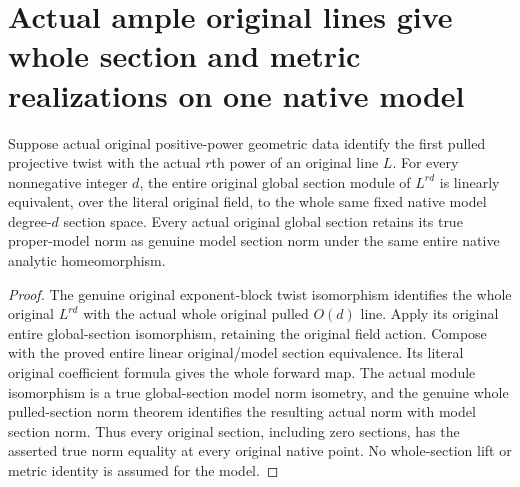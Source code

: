 \section{Actual ample original lines give whole section and metric realizations on one native model}
\label{sec:native-ample-model-section-blocks}

\begin{theorem}
\label{thm:native-ample-model-section-block-map}
\leanok
{}
Suppose actual original positive-power geometric data identify the first
pulled projective twist with the actual $r$th power of an original line
$L$. For every nonnegative integer $d$, the entire original global section
module of $L^{rd}$ is linearly equivalent, over the literal original field,
to the whole same fixed native model degree-$d$ section space. Every actual
original global section retains its true proper-model norm as genuine model
section norm under the same entire native analytic homeomorphism.
\end{theorem}
\begin{proof}
The genuine original exponent-block twist isomorphism identifies the whole
original $L^{rd}$ with the actual whole original pulled $O(d)$ line. Apply
its original entire global-section isomorphism, retaining the original
field action. Compose with the proved entire linear original/model section
equivalence. Its literal original coefficient formula gives the whole
forward map. The actual module isomorphism is a true global-section model
norm isometry, and the genuine whole pulled-section norm theorem identifies
the resulting actual norm with model section norm. Thus every original
section, including zero sections, has the asserted true norm equality at
every original native point. No whole-section lift or metric identity is
assumed for the model.
\end{proof}

